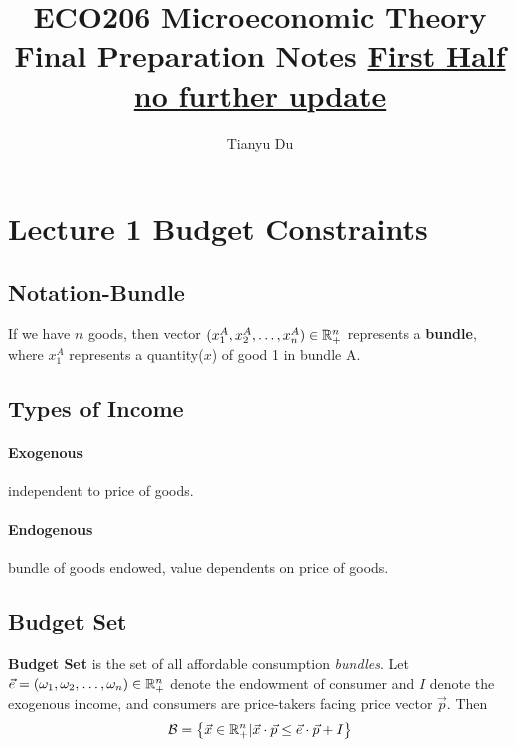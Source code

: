 \documentclass[]{article}
\title{ECO206 Microeconomic Theory \\ \small Final Preparation Notes \ul{First Half} \\ \ul{no further update}}
\author{Tianyu Du}
\begin{document}
    \maketitle
    \doclicenseThis
    \tableofcontents

    \section{Lecture 1 Budget Constraints}
    
        \subsection{Notation-Bundle}
            \begin{definition}
                If we have $n$ goods, then vector $(x_1^A, x_2^A, \dots, x_n^A) \in \mathbb{R}^n_+$ represents a \textbf{bundle}, where $x_1^A$ represents a quantity($x$) of good 1 in bundle A. 
            \end{definition}
            
        \subsection{Types of Income}
            \paragraph{Exogenous}independent to price of goods.
            \paragraph{Endogenous}bundle of goods endowed, value dependents on price of goods.
            
        \subsection{Budget Set}
            \begin{definition}
                \textbf{Budget Set} is the set of all affordable consumption \emph{bundles}. Let $\vec{e}=(\omega_1,\omega_2,\dots,\omega_n) \in \mathbb{R}^n_+$ denote the endowment of consumer and $I$ denote the exogenous income, and consumers are price-takers facing price vector $\vec{p}$. Then
                \[
                    \mathcal{B} = \big\{\vec{x}\in \mathbb{R}^n_+ \vert \vec{x}\cdot\vec{p} \leq \vec{e}\cdot\vec{p} + I  \big\}
                \]
            \end{definition}
            
\end{document}
